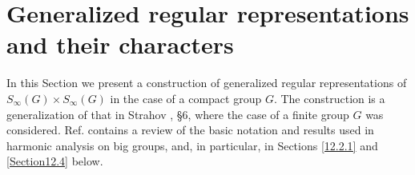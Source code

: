 \documentclass[12pt]{amsart}
\theoremstyle{definition}
\numberwithin{equation}{section}
\begin{document}
\section{Generalized regular representations and their characters}\label{SECTIONGENERALIZEDREGULARREPRESENTATIONS}
In this Section we present a construction of generalized regular representations of $S_{\infty}(G)\times S_{\infty}(G)$ in the case of a compact group $G$. The construction is a generalization of that in Strahov
\cite{StrahovIsr25}, \S 6,  where the case of a finite group $G$ was considered. Ref. \cite{StrahovIsr25} contains a review of the basic notation and results used in harmonic analysis on big groups, and, in particular,
in Sections \ref{12.2.1} and \ref{Section12.4} below.
\end{document}
